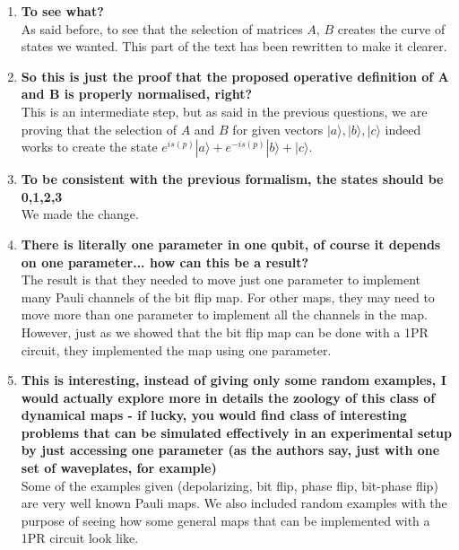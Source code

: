 \documentclass[10pt,letterpaper]{article} %
\begin{document}
\begin{enumerate}
\item \textbf{To see what?} \\

As said before, to see that the selection of matrices $A$, $B$ creates 
the curve of states we wanted.
This part of the text has been rewritten to make it clearer.\\


\item \textbf{So this is just the proof that the proposed operative definition of A and B is properly normalised, right?} \\

This is an intermediate step, but as said in the previous questions, 
we are proving that the selection of $A$ and $B$ for given vectors $|a\rangle, |b\rangle, |c\rangle$ 
indeed works to create the state
$e^{is(p)} |a \rangle + e^{-is(p)} |b \rangle + |c\rangle$.\\

\item \textbf{To be consistent with the previous formalism, the states should be 0,1,2,3}\\

We made the change.\\

\item \textbf{There is literally one parameter in one qubit, of course it depends on one parameter...
 how can this be a result?} \\
 
The result is that they needed  to move just one parameter to implement 
many Pauli channels of the bit flip map.
For other maps, they may need to move more than one parameter to 
implement all the channels in the map. 
However, just as we showed that the bit flip map can be done with a 1PR circuit,
they implemented the map using one parameter.\\
  
 \item  \textbf{This is interesting, instead of giving only some random examples, I would actually explore more in details the zoology of this class of dynamical maps - if lucky, you would find class of interesting problems that can be simulated effectively in an experimental setup by just accessing one parameter (as the authors say, just with one set of waveplates, for example)} \\
 
Some of the examples given (depolarizing, bit flip, phase flip, bit-phase flip) are very well known 
Pauli maps.
We also included random examples with the purpose of seeing how some general maps that 
can be implemented with a 1PR circuit look like.
 

\end{enumerate}
\end{document}
